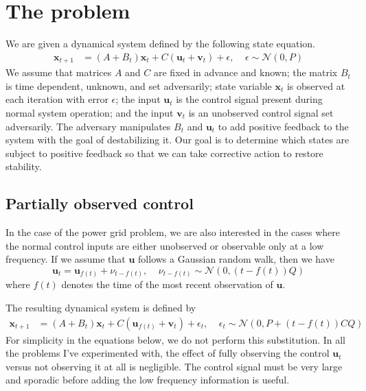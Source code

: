 \documentclass{article}
\newcommand{\normal}[2]{\ensuremath{\mathcal{N}\left({{#1}},{{#2}}\right)}}
\newcommand{\x}{\mathbf{x}}
\newcommand{\uu}{\mathbf{u}}
\newcommand{\vv}{\mathbf{v}}
\begin{document}

\section{The problem}
We are given a dynamical system defined by the following state equation.
\begin{align}
\label{sys:orig}
\x_{t+1} &= (A + B_t)\x_t + C(\uu_t + \vv_t) + \epsilon,~~~~~ \epsilon \sim \normal{0}{P}
\end{align}
We assume that matrices $A$ and $C$ are fixed in advance and known;
the matrix $B_t$ is time dependent, unknown, and set adversarily;
state variable $\x_t$ is observed at each iteration with error $\epsilon$;
the input $\uu_t$ is the control signal present during normal system operation;
and the input $\vv_t$ is an unobserved control signal set adversarily.
The adversary manipulates $B_t$ and $\uu_t$ to add positive feedback to the system with the goal of destabilizing it.
Our goal is to determine which states are subject to positive feedback so that we can take corrective action to restore stability.

\subsection{Partially observed control}

In the case of the power grid problem,
we are also interested in the cases where the normal control inputs are either unobserved or observable only at a low frequency.
If we assume that $\uu$ follows a Gaussian random walk, then we have
\begin{equation}
\uu_t = \uu_{f(t)} + \nu_{t-f(t)}
,~~~~~ \nu_{t-f(t)} \sim \normal{0}{(t-f(t))Q}
\end{equation}
where $f(t)$ denotes the time of the most recent observation of $\uu$.

The resulting dynamical system is defined by
\begin{align}
\label{sys:orig}
\x_{t+1} &= (A + B_t)\x_t + C(\uu_{f(t)} + \vv_t) + \epsilon_t
,~~~~~ \epsilon_t \sim \normal{0}{P+(t-f(t))CQ}
\end{align}
For simplicity in the equations below, we do not perform this substitution.
In all the problems I've experimented with, the effect of fully observing the control $\uu_t$ versus not observing it at all is negligible.
The control signal must be very large and sporadic before adding the low frequency information is useful.
\end{document}
